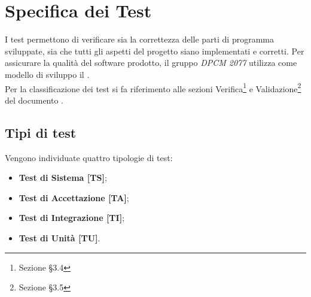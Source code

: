 
\section{Specifica dei Test}
I test permettono di verificare sia la correttezza delle parti di programma sviluppate, sia che tutti gli aspetti del progetto siano implementati e corretti.
Per assicurare la qualità del software prodotto, il gruppo \textit{DPCM 2077} utilizza come modello di sviluppo il .
\\
Per la classificazione dei test si fa riferimento alle sezioni Verifica\footnote{Sezione §3.4} e Validazione\footnote{Sezione §3.5} del documento .
	\subsection{Tipi di test}
	Vengono individuate quattro tipologie di test:
	\begin{itemize}
		\item \textbf{Test di Sistema [TS]};
		\item \textbf{Test di Accettazione [TA]};
		\item \textbf{Test di Integrazione [TI]};
		\item \textbf{Test di Unità [TU]}.
	\end{itemize}
